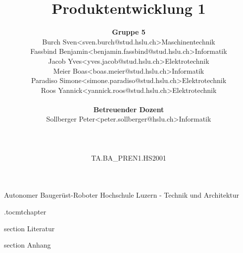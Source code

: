 \documentclass[oneside]{modern}
\title{Produktentwicklung 1}
\author{
\begin{tabular}{ l l l}
  \textbf{Gruppe 5} && \\
  Burch Sven & <sven.burch@stud.hslu.ch> & Maschinentechnik\\
  Fassbind Benjamin & <benjamin.fassbind@stud.hslu.ch> & Informatik \\
  Jacob Yves & <yves.jacob@stud.hslu.ch> & Elektrotechnik\\
  Meier Boas & <boas.meier@stud.hslu.ch> & Informatik\\
  Paradiso Simone & <simone.paradiso@stud.hslu.ch> & Elektrotechnik \\
  Roos Yannick & <yannick.roos@stud.hslu.ch> & Elektrotechnik \\
  \\
  \textbf{Betreuender Dozent} && \\
  Sollberger Peter & <peter.sollberger@hslu.ch> & Informatik \\
  \\
  \\
  \\
  TA.BA\_PREN1.HS2001 &&\\
\end{tabular}
}
\begin{document}
   \renewcommand{\thesection}{\arabic{section}}
   \makeatletter
   \g@addto@macro{\UrlBreaks}{\UrlOrds}
   \makeatother
   


  \nocite{*}

  \firstpage
    {Autonomer Baugerüst-Roboter}
    {Hochschule Luzern - Technik und Architektur}
    {\theauthor}


  
  
  \newpage
  \etocdepthtag.toc{mtchapter}
  \addtableofcontents
  
  \newpage
  \listoffigures
  
  \newpage
  \listoftables

  \newpage
  
  

  
  
  
  
  
  
  
  

  \newpage
  \addglossary

  \newpage
    {section}
    {Literatur}

  \printbibliography[
    heading=subbibliography
  ]

    {section}
    {Anhang}
    
  
\end{document}
